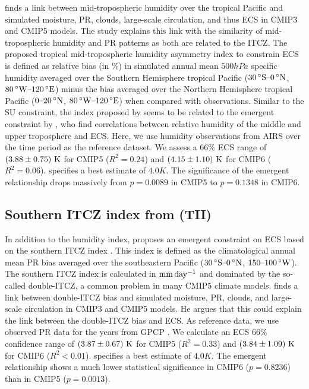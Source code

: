 \textcite{Tian2015} finds a link between mid-tropospheric humidity over the
tropical Pacific and simulated moisture, \acl{PR}, clouds, large-scale
circulation, and thus \ac{ECS} in \acs{CMIP}3 and \acs{CMIP}5 models. The study
explains this link with the similarity of mid-tropospheric humidity and
\acl{PR} patterns as both are related to the \ac{ITCZ}. The proposed tropical
mid-tropospheric humidity asymmetry index to constrain \ac{ECS} is defined as
relative bias (in $\si{\%}$) in simulated annual mean $500 \unit{hPa}$ specific
humidity averaged over the Southern Hemisphere tropical Pacific ($\range{30
  \unit{\degree S}}{0 \unit{\degree N}}$, $\range{80 \unit{\degree W}}{120
  \unit{\degree E}}$) minus the bias averaged over the Northern Hemisphere
tropical Pacific ($\rangeunit{0}{20}{\degree N}$, $\range{80 \unit{\degree
    W}}{120 \unit{\degree E}}$) when compared with observations. Similar to
the SU constraint, the index proposed by \textcite{Tian2015} seems to be
related to the emergent constraint by \textcite{Fasullo2012}, who find
correlations between relative humidity of the middle and upper troposphere and
\ac{ECS}. Here, we use humidity observations from AIRS \autocite{Aumann2003}
over the time period  as the reference dataset. We assess a
$66 \unit{\%}$ \ac{ECS} range of $\pmrangeunit{3.88}{0.75}{K}$ for \acs{CMIP}5
($R^2 = 0.24$) and $\pmrangeunit{4.15}{1.10}{K}$ for \acs{CMIP}6 ($R^2 =
0.06$). \Textcite{Tian2015} specifies a best estimate of $4.0 \unit{K}$. The
significance of the emergent relationship drops massively from $p = 0.0089$ in
\acs{CMIP}5 to $p = 0.1348$ in \acs{CMIP}6.


\subsection{Southern \acs{ITCZ} index from (TII)}
\label{subsec:05:tii}

In addition to the humidity index, \textcite{Tian2015} proposes an emergent
constraint on \ac{ECS} based on the southern \ac{ITCZ} index
\autocite{Bellucci2010, Hirota2011}. This index is defined as the
climatological annual mean \acl{PR} bias averaged over the southeastern Pacific
($\range{30 \unit{\degree S}}{0 \unit{\degree N}}$,
$\rangeunit{150}{100}{\degree W}$). The southern \ac{ITCZ} index is calculated
in $\si{\mmday{}}$ and dominated by the so-called double-\ac{ITCZ}, a common
problem in many \acs{CMIP}5 climate models. \Textcite{Tian2015} finds a link
between double-\ac{ITCZ} bias and simulated moisture, \acl{PR}, clouds, and
large-scale circulation in \acs{CMIP}3 and \acs{CMIP}5 models. He argues that
this could explain the link between the double-\acs{ITCZ} bias and \ac{ECS}. As
reference data, we use observed \acl{PR} data for the years 
from GPCP \autocite{Adler2003}. We calculate an \ac{ECS} $66 \unit{\%}$
confidence range of $\pmrangeunit{3.87}{0.67}{K}$ for \acs{CMIP}5 ($R^2 =
0.33$) and $\pmrangeunit{3.84}{1.09}{K}$ for \acs{CMIP}6 ($R^2 < 0.01$).
\Textcite{Tian2015} specifies a best estimate of $4.0 \unit{K}$. The emergent
relationship shows a much lower statistical significance in \acs{CMIP}6 ($p =
0.8236$) than in \acs{CMIP}5 ($p = 0.0013$).


